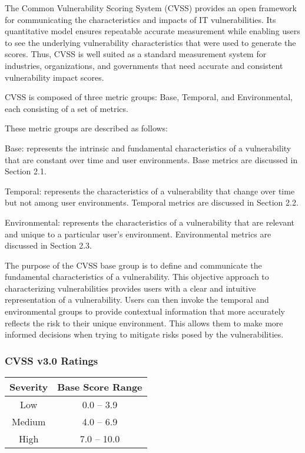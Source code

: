     The Common Vulnerability Scoring System (CVSS) provides an open
    framework for communicating the characteristics and impacts of IT
    vulnerabilities. Its quantitative model ensures repeatable accurate
    measurement while enabling users to see the underlying vulnerability
    characteristics that were used to generate the scores. Thus, CVSS is
    well suited as a standard measurement system for industries,
    organizations, and governments that need accurate and consistent
    vulnerability impact scores.

    CVSS is composed of three metric groups: Base, Temporal, and
    Environmental, each consisting of a set of metrics.

    These metric groups are described as follows:

    Base: represents the intrinsic and fundamental characteristics of a
    vulnerability that are constant over time and user environments. Base
    metrics are discussed in Section 2.1.

    Temporal: represents the characteristics of a vulnerability that change
    over time but not among user environments. Temporal metrics are
    discussed in Section 2.2.

    Environmental: represents the characteristics of a vulnerability that
    are relevant and unique to a particular user's environment.
    Environmental metrics are discussed in Section 2.3.

    The purpose of the CVSS base group is to define and communicate the
    fundamental characteristics of a vulnerability. This objective approach
    to characterizing vulnerabilities provides users with a clear and
    intuitive representation of a vulnerability. Users can then invoke the
    temporal and environmental groups to provide contextual information that
    more accurately reflects the risk to their unique environment. This
    allows them to make more informed decisions when trying to mitigate
    risks posed by the vulnerabilities.

    \subsubsection{CVSS v3.0 Ratings}\label{subsec:cvss-v3.0-ratings}

      \begin{center}
        \begin{tabularx}{0.4\textwidth}{c c}
          \toprule
          \textbf{Severity} & \textbf{Base Score Range} \\ \midrule
          Low    & 0.0 -- 3.9  \\ \midrule
          Medium & 4.0 -- 6.9  \\ \midrule
          High   & 7.0 -- 10.0 \\
          \bottomrule
        \end{tabularx}
      \end{center}

